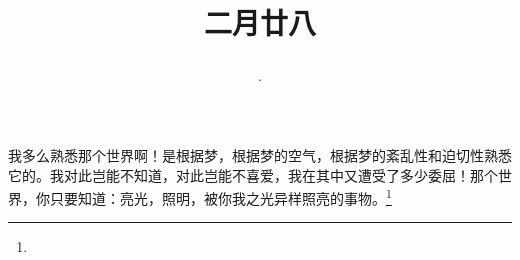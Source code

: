 \title{\date[d=6,m=4,y=2024][year:cn-y,年,month:cn,day:cn,日,·,weekday]·二月廿八 }
我多么熟悉那个世界啊！是根据梦，根据梦的空气，根据梦的紊乱性和迫切性熟悉它的。我对此岂能不知道，对此岂能不喜爱，我在其中又遭受了多少委屈！那个世界，你只要知道：亮光，照明，被你我之光异样照亮的事物。\footnote{ }

